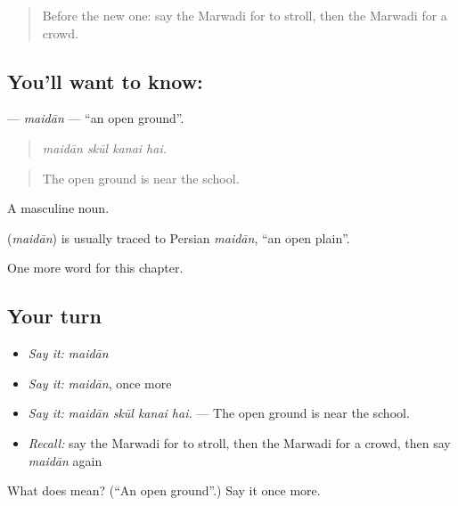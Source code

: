 \label{lesson:MW-C204-maidan}



\begin{quote}
Before the new one: say the Marwadi for to stroll, then the Marwadi for a crowd.
\end{quote}

\subsection*{You'll want to know: }
\textbf{} — \emph{maidān} — \textquotedblleft{}an open ground\textquotedblright{}.

\begin{quote}
   
\end{quote}

\begin{quote}
\emph{maidān skūl kanai hai.}
\end{quote}

\begin{quote}
The open ground is near the school.
\end{quote}

A masculine noun.

\begin{cousinweb}
\textbf{} (\emph{maidān}) is usually traced to Persian \emph{maidān}, \textquotedblleft{}an open plain\textquotedblright{}.
\end{cousinweb}

\begin{grammarlens}[title={What you've built}]
One more word for this chapter.
\end{grammarlens}

\subsection*{Your turn}
\begin{itemize}
\raggedright
  \item \emph{Say it:} \emph{maidān}
  \item \emph{Say it:} \emph{maidān}, once more
  \item \emph{Say it:} \emph{maidān skūl kanai hai.} — The open ground is near the school.
  \item \emph{Recall:} say the Marwadi for to stroll, then the Marwadi for a crowd, then say \emph{maidān} again
\end{itemize}

\begin{tcolorbox}[breakable,colback=teal!4,colframe=teal!35!black,title={Before you move on}]
What does  mean? (\textquotedblleft{}An open ground\textquotedblright{}.) Say it once more.
\end{tcolorbox}
